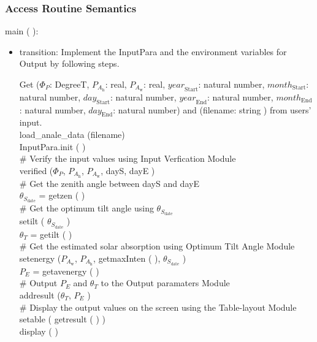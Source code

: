 \documentclass[12pt, titlepage]{article}
\begin{document}
\subsubsection{ Access Routine Semantics}

\noindent  main ( ):

\begin{itemize}
\item transition: Implement the InputPara and  the environment variables for Output by following steps.

Get ($\Phi_P$: DegreeT, $P_{A_{\text{h}}}$: real, $P_{A_{\text{w}}}$: real, $\mathit{year}_\text{Start}$: natural number, $\mathit{month}_\text{Start}$: natural number, $\mathit{day}_\text{Start}$: natural number, $\mathit{year}_\text{End}$: natural number, $\mathit{month}_\text{End}$: natural number, $\mathit{day}_\text{End}$: natural number) and (filename: string ) from users' input.\\


load\_anale\_data (filename)\\
InputPara.init ( )\\

$\#$ Verify the input values using Input Verfication Module\\
verified ($\Phi_P$, $P_{A_{\text{h}}}$, $P_{A_{\text{w}}}$, dayS, dayE )\\

$\#$ Get the zenith angle between dayS and
dayE\\
$\theta_{S_{\text{date}}}$ = getzen ( )\\

$\#$ Get the optimum tilt angle using $\theta_{S_{\text{date}}}$\\
setilt ( $\theta_{S_{\text{date}}}$ )\\
$\theta_{T}$ = getilt ( )\\


$\#$ Get the estimated solar absorption using Optimum Tilt Angle Module\\
setenergy ($P_{A_{\text{w}}}$, $P_{A_{\text{h}}}$, getmaxInten ( ), $\theta_{S_{\text{date}}}$ )\\
$P_{E}$ = getavenergy ( )\\

$\#$ Output $P_{E}$ and $\theta_{T}$ to the Output paramaters Module\\
addresult ($\theta_{T}$, $P_{E}$ )\\

$\#$ Display the output values on the screen using the Table-layout Module\\
setable ( getresult ( ) )\\
display ( )

\end{itemize}
\end{document}

